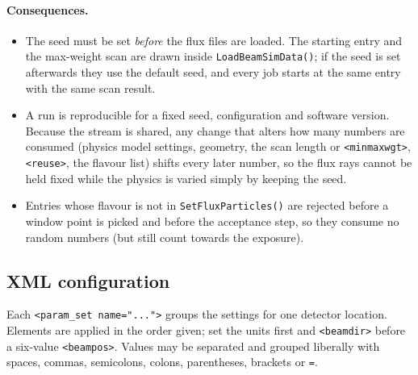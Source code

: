 \documentclass[11pt]{article}
\newcommand{\code}[1]{\texttt{#1}}
\begin{document}
\paragraph{Consequences.}
\begin{itemize}[nosep]
\item The seed must be set \emph{before} the flux files are loaded.  The
      starting entry and the max-weight scan are drawn inside
      \code{LoadBeamSimData()}; if the seed is set afterwards they use the
      default seed, and every job starts at the same entry with the same
      scan result.
\item A run is reproducible for a fixed seed, configuration and software
      version.  Because the stream is shared, any change that alters how
      many numbers are consumed (physics model settings, geometry, the scan
      length or \code{<minmaxwgt>}, \code{<reuse>}, the flavour list) shifts
      every later number, so the flux rays cannot be held fixed while the
      physics is varied simply by keeping the seed.
\item Entries whose flavour is not in \code{SetFluxParticles()} are
      rejected before a window point is picked and before the acceptance
      step, so they consume no random numbers (but still count towards the
      exposure).
\end{itemize}

\subsection{XML configuration}\label{sec:genie-xml}

Each \code{<param\_set name="...">} groups the settings for one detector
location.  Elements are applied in the order given; set the units first and
\code{<beamdir>} before a six-value \code{<beampos>}.  Values may be
separated and grouped liberally with spaces, commas, semicolons, colons,
parentheses, brackets or \code{=}.
\end{document}
